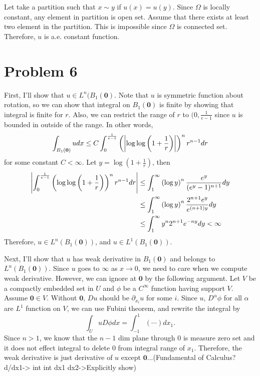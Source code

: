\documentclass{article}
\begin{document}
Let take a partition such that $x\sim y$ if $u(x)=u(y)$. Since $\Omega$ is locally constant, any element in partition is open set. Assume that there exists at least two element in the partition. This is impossible since $\Omega$ is connected set. Therefore, $u$ is a.e. constant function.
\section*{Problem 6}
First, I'll show that $u\in L^n(B_1(\bm{0})$. Note that $u$ is symmetric function about rotation, so we can show that integral on $B_1(\bm{0})$ is finite by showing that integral is finite for $r$. Also, we can restrict the range of $r$ to $(0, \frac{1}{e-1}$ since $u$ is bounded in outside of the range. In other words,
\begin{equation*}
\int_{B_1(\bm{0})}udx\leq C\int_0^{\frac{1}{e-1}} \left(\abs{\log\log\left(1+\frac{1}{r}\right)}\right)^{n}r^{n-1}dr
\end{equation*}
for some constant $C<\infty$. Let $y=\log\left(1+\frac{1}{r}\right)$, then
\begin{equation*}
\begin{split}
\abs{\int_0^{\frac{1}{e-1}} \left(\log\log\left(1+\frac{1}{r}\right)\right)^{n}r^{n-1}dr}&\leq\int_{1}^\infty \left(\log y\right)^n \frac{e^y}{(e^y-1)^{n+1}} dy \\
&\leq \int_{1}^\infty\left(\log y\right)^n \frac{2^{n+1}e^y}{e^{(n+1)y}}dy \\
&\leq \int_{1}^\infty y^n 2^{n+1}e^{-ny}dy<\infty
\end{split}
\end{equation*}
Therefore, $u\in L^n(B_1(\bm{0}))$, and $u\in L^1(B_1(\bm{0}))$.

Next, I'll show that $u$ has weak derivative in $B_1(\bm{0})$ and belongs to $L^n(B_1(\bm{0}))$. Since $u$ goes to $\infty $ as $x\rightarrow 0$, we need to care when we compute weak derivative. However, we can ignore at $\bm{0}$ by the following argument. Let $V$ be a compactly embedded set in $U$ and $\phi$ be a $C^\infty$ function having support $V$. Assume $\bm{0}\in V$. Without $\bm{0}$, $D u$ should be $\partial_{x_i}u$ for some $i$. Since $u$, $D^\alpha \phi$ for all $\alpha$ are $L^1$ function on $V$, we can use Fubini theorem, and rewrite the integral by
\begin{equation*}
\int_U uD \phi dx=\int_{-1}^1 (\cdots) dx_1.
\end{equation*}
Since $n>1$, we know that the $n-1$ dim plane through $0$ is measure zero set and it does not effect integral to delete $0$ from integral range of $x_1$. Therefore, the weak derivative is just derivative of $u$ except $\bm{0}$...(Fundamental of Calculus? d/dx1-> int int dx1 dx2->Explicitly show)
\end{document}

